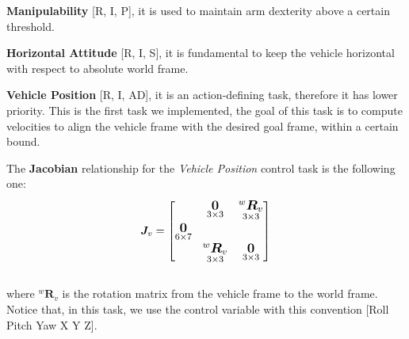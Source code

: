 \documentclass{article}
\begin{document}
\noindent
\begin{description}
	\item \textbf{Manipulability} [R, I, P], it is used to maintain arm dexterity above a certain threshold.
	\item \textbf{Horizontal Attitude} [R, I, S], it is fundamental to keep the vehicle horizontal with respect to absolute world frame. 
	\item \textbf{Vehicle Position} [R, I, AD], it is an action-defining task, therefore it has lower priority. This is the first task we implemented, the goal of this task is to compute velocities to align the vehicle frame with the desired goal frame, within a certain bound.
\end{description}

\noindent
\vspace{5px}
The \textbf{Jacobian} relationship for the \textit{Vehicle Position} control task is the following one:
\begin{equation}
\large
    \boldsymbol{J}_v = \begin{bmatrix}
 & \underset{3\times3}{\boldsymbol{0}} & \underset{3\times3}{^{w}\boldsymbol{R}_{v}} \\
\underset{6\times7}{\boldsymbol{0}} \\
& \underset{ 3\times 3}{^{w}\boldsymbol{R}_{v}} & \underset{3\times 3}{\boldsymbol{0}} \\
\end{bmatrix}
\end{equation}
\\ 
where ${^{w}\boldsymbol{R}_{v}}$ is the rotation matrix from the vehicle frame to the world frame.
Notice that, in this task, we use the control variable with this convention [Roll Pitch Yaw X Y Z].
\end{document}
